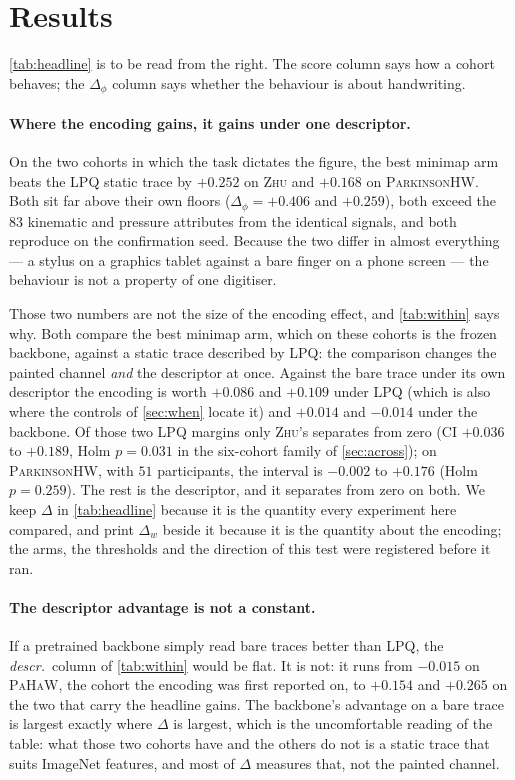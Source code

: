 \documentclass[10pt,a4paper]{article}
\begin{document}
\section{Results}
\label{sec:results}




\cref{tab:headline} is to be read from the right. The score column says how a cohort behaves; the
$\Delta_\phi$ column says whether the behaviour is about handwriting.

\paragraph{Where the encoding gains, it gains under one descriptor.} On the two cohorts in which the
task dictates the figure, the best minimap arm beats the LPQ static trace by $+0.252$ on
\textsc{Zhu} and $+0.168$ on \textsc{ParkinsonHW}. Both sit far above their own floors
($\Delta_\phi = +0.406$ and $+0.259$), both exceed the $83$ kinematic and pressure attributes
from the identical signals, and both reproduce on the confirmation seed. Because
the two differ in almost everything --- a stylus on a graphics tablet against a bare finger on a
phone screen --- the behaviour is not a property of one digitiser.



Those two numbers are not the size of the encoding effect, and \cref{tab:within} says why. Both
compare the best minimap arm, which on these cohorts is the frozen backbone, against a static trace
described by LPQ: the comparison changes the painted channel \emph{and} the descriptor at once.
Against the bare trace under its own descriptor the encoding is worth $+0.086$ and $+0.109$ under
LPQ (which is also where the controls of \cref{sec:when} locate it) and $+0.014$ and $-0.014$
under the backbone. Of those two LPQ margins only \textsc{Zhu}'s separates from zero (CI $+0.036$ to
$+0.189$, Holm $p = 0.031$ in the six-cohort family of \cref{sec:across}); on
\textsc{ParkinsonHW}, with $51$ participants, the interval is $-0.002$ to $+0.176$
(Holm $p = 0.259$). The rest is the descriptor, and it separates from zero on
both. We keep $\Delta$ in \cref{tab:headline} because it is the quantity every experiment here
compared, and print $\Delta_w$ beside it because it is the quantity about the encoding; the arms,
the thresholds and the direction of this test were registered before it ran.

\paragraph{The descriptor advantage is not a constant.} If a pretrained backbone simply read bare
traces better than LPQ, the \emph{descr.}\ column of \cref{tab:within} would be flat. It is not: it
runs from $-0.015$ on \textsc{PaHaW}, the cohort the encoding was first reported on, to $+0.154$ and
$+0.265$ on the two that carry the headline gains. The backbone's advantage on a bare trace is
largest exactly where $\Delta$ is largest, which is
the uncomfortable reading of the table: what those two cohorts have and the others do not is a
static trace that suits ImageNet features, and most of $\Delta$ measures that, not the painted
channel.
\end{document}
